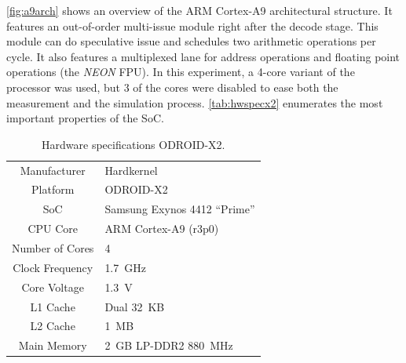 \autoref{fig:a9arch} shows an overview of the ARM Cortex-A9 architectural
structure. It features an out-of-order multi-issue module right after the decode
stage. This module can do speculative issue and schedules two arithmetic
operations per cycle. It also features a multiplexed lane for address operations
and floating point operations (the \emph{NEON} FPU). In this experiment, a
4-core variant of the processor was used, but 3 of the cores were disabled to
ease both the measurement and the simulation process. \autoref{tab:hwspecx2}
enumerates the most important properties of the SoC.


\begin{table}
    \centering
    \begin{tabular}{|c|l|}
        \rowcolor{gray!25}
        \hline
        Manufacturer   & Hardkernel \\
        Platform       & ODROID-X2 \\
        SoC            & Samsung Exynos 4412 ``Prime'' \\
        CPU Core       & ARM Cortex-A9 (r3p0) \\
        Number of Cores& 4 \\
        Clock Frequency& 1.7~GHz \\
        Core Voltage   & 1.3~V \\
        L1 Cache       & Dual 32~KB \\
        L2 Cache       & 1~MB \\
        Main Memory    & 2~GB LP-DDR2 880~MHz \\
        \hline
    \end{tabular}
    \caption{Hardware specifications ODROID-X2.}
    \label{tab:hwspecx2}
\end{table}

